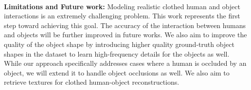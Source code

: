 \\\textbf{Limitations and Future work:} Modeling realistic clothed human and object interactions is an extremely challenging problem. 
This work represents the first step toward achieving this goal. The accuracy of the interaction between humans and objects will be further improved in future works. We also aim to improve the quality of the object shape by introducing higher quality ground-truth object shapes in the dataset to learn high-frequency details for the objects as well.  While our approach specifically addresses cases where a human is occluded by an object, we will extend it to handle object occlusions as well. 
We also aim to retrieve textures for clothed human-object reconstructions. 